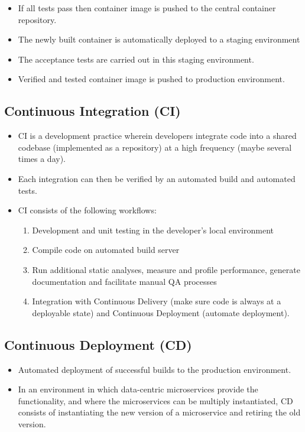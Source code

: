 \documentclass{article}
\begin{document}
\begin{itemize}
\begin{itemize}
        \item If all tests pass then container image is pushed to the central container repository.
        
        \item The newly built container is automatically deployed to a staging environment
        
        \item The acceptance tests are carried out in this staging environment. 
        
        \item Verified and tested container image is pushed to production environment. 
    \end{itemize}
\end{itemize}

\subsection{Continuous Integration (CI)}
\begin{itemize}
    \item CI is a development practice wherein developers integrate code into a shared codebase (implemented as a repository) at a high frequency (maybe several times a day). 
    
    \item Each integration can then be verified by an automated build and automated tests.
    
    \item CI consists of the following workflows:
    \begin{enumerate}
        \item Development and unit testing in the developer's local environment
        
        \item Compile code on automated build server
        
        \item Run additional static analyses, measure and profile performance, generate documentation and facilitate manual QA processes
        
        \item Integration with Continuous Delivery (make sure code is always at a deployable state) and Continuous Deployment (automate deployment).
    \end{enumerate}
\end{itemize}

\subsection{Continuous Deployment (CD)}
\begin{itemize}
    \item Automated deployment of successful builds to the production environment. 
    
    \item In an environment in which data-centric microservices provide the functionality, and where the microservices can be multiply instantiated, CD consists of instantiating the new version of a microservice and retiring the old version. 
\end{itemize}
\end{document}
